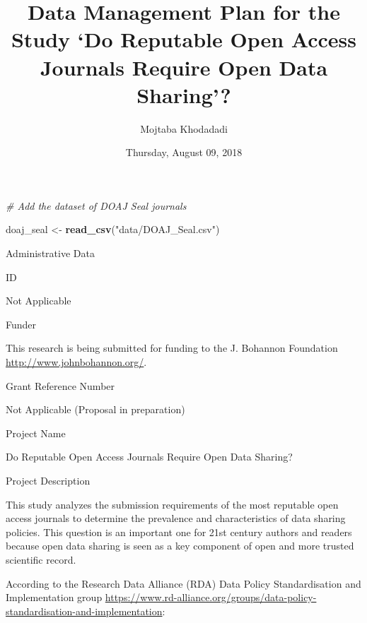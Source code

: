 \documentclass[ignorenonframetext,]{beamer}
\title{Data Management Plan for the Study `Do Reputable Open Access Journals
Require Open Data Sharing'?}
\author{Mojtaba Khodadadi}
\date{Thursday, August 09, 2018}
\newenvironment{Shaded}{\begin{snugshade}}{\end{snugshade}}
\newcommand{\KeywordTok}[1]{\textcolor[rgb]{0.13,0.29,0.53}{\textbf{#1}}}
\newcommand{\StringTok}[1]{\textcolor[rgb]{0.31,0.60,0.02}{#1}}
\newcommand{\CommentTok}[1]{\textcolor[rgb]{0.56,0.35,0.01}{\textit{#1}}}
\newcommand{\NormalTok}[1]{#1}
\begin{document}
\frame{\titlepage}

\begin{frame}[fragile]

\begin{Shaded}
\begin{Highlighting}[]
\CommentTok{# Add the dataset of DOAJ Seal journals}

\NormalTok{doaj_seal <-}\StringTok{ }\KeywordTok{read_csv}\NormalTok{(}\StringTok{"data/DOAJ_Seal.csv"}\NormalTok{)}
\end{Highlighting}
\end{Shaded}

\end{frame}

\begin{frame}{Administrative Data}

\begin{block}{ID}

Not Applicable

\end{block}

\begin{block}{Funder}

This research is being submitted for funding to the J. Bohannon
Foundation \url{http://www.johnbohannon.org/}.

\end{block}

\begin{block}{Grant Reference Number}

Not Applicable (Proposal in preparation)

\end{block}

\begin{block}{Project Name}

Do Reputable Open Access Journals Require Open Data Sharing?

\begin{block}{Project Description}

This study analyzes the submission requirements of the most reputable
open access journals to determine the prevalence and characteristics of
data sharing policies. This question is an important one for 21st
century authors and readers because open data sharing is seen as a key
component of open and more trusted scientific record.

According to the Research Data Alliance (RDA) Data Policy
Standardisation and Implementation group
\url{https://www.rd-alliance.org/groups/data-policy-standardisation-and-implementation}:


\end{block}
\end{block}
\end{frame}
\end{document}
